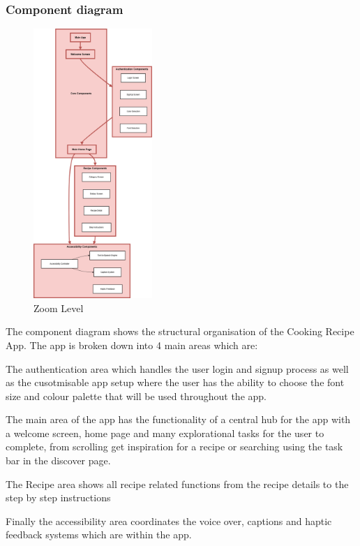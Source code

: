 \documentclass[]{project_final}
\begin{document}
\subsubsection{Component diagram}
\begin{figure}[ht!]
    \centering
    \includegraphics[width=0.4\textwidth]{componentDiagram.png}
    \vspace*{0.0cm}
    \caption{Zoom Level}
    \label{fig:1}
\end{figure}

The component diagram shows the structural organisation of the Cooking Recipe App. The app is broken down into 4 main areas which are:

The authentication area which handles the user login and signup process as well as the cusotmisable app setup where the user has the ability to choose the font size and colour palette that will be used throughout the app.

The main area of the app has the functionality of a central hub for the app with a welcome screen, home page and many explorational tasks for the user to complete, from scrolling get inspiration for a recipe or searching using the task bar in the discover page.

The Recipe area shows all recipe related functions from the recipe details to the step by step instructions

Finally the accessibility area coordinates the voice over, captions and haptic feedback systems which are within the app.
\end{document}

